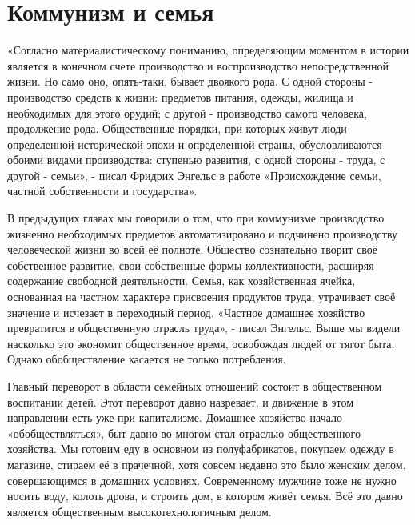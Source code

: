 \documentclass[../main]{subfiles}
\begin{document}
\ifSubfilesClassLoaded{\setcounter{page}{50}}{}
\section{Коммунизм и семья}
\label{sec:09_kommunizm_semya}

«Согласно материалистическому пониманию, определяющим моментом в истории является в конечном счете производство и воспроизводство непосредственной жизни. Но само оно, опять-таки, бывает двоякого рода. С одной стороны - производство средств к жизни: предметов питания, одежды, жилища и необходимых для этого орудий; с другой - производство самого человека, продолжение рода. Общественные порядки, при которых живут люди определенной исторической эпохи и определенной страны, обусловливаются обоими видами производства: ступенью развития, с одной стороны - труда, с другой - семьи», - писал Фридрих Энгельс в работе «Происхождение семьи, частной собственности и государства».

В предыдущих главах мы говорили о том, что при коммунизме производство жизненно необходимых предметов автоматизировано и подчинено производству человеческой жизни во всей её полноте. Общество сознательно творит своё собственное развитие, свои собственные формы коллективности, расширяя содержание свободной деятельности. Семья, как хозяйственная ячейка, основанная на частном характере присвоения продуктов труда, утрачивает своё значение и исчезает в переходный период. «Частное домашнее хозяйство превратится в общественную отрасль труда», - писал Энгельс. Выше мы видели насколько это экономит общественное время, освобождая людей от тягот быта. Однако обобществление касается не только потребления.

Главный переворот в области семейных отношений состоит в общественном воспитании детей. Этот переворот давно назревает, и движение в этом направлении есть уже при капитализме. Домашнее хозяйство начало «обобществляться», быт давно во многом стал отраслью общественного хозяйства. Мы готовим еду в основном из полуфабрикатов, покупаем одежду в магазине, стираем её в прачечной, хотя совсем недавно это было женским делом, совершающимся в домашних условиях. Современному мужчине тоже не нужно носить воду, колоть дрова, и строить дом, в котором живёт семья. Всё это давно является общественным высокотехнологичным делом.
\end{document}
